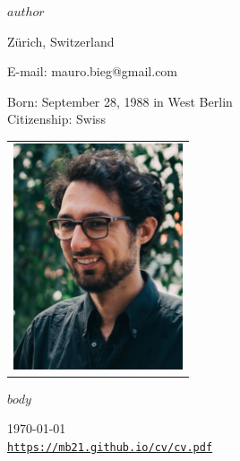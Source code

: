 \documentclass{article}
\def\name{$author$}
\def\footerlink{https://mb21.github.io/cv/cv.pdf}
\begin{document}
\begin{minipage}{10cm}
	{\huge \name}
	
	\vspace{7mm}
	
	Zürich, Switzerland\\
	
	\vspace{-3mm}
	
	E-mail: mauro.bieg@gmail.com\\
	
	\vspace{-3mm}
	
	Born: September 28, 1988 in West Berlin \\
	Citizenship: Swiss
\end{minipage}
\begin{minipage}{50mm}
  \begin{tabular}{r}
  	\includegraphics[width=50mm]{me.jpg}
  \end{tabular}
\end{minipage}



$body$

\bigskip

\begin{center}
  \begin{footnotesize}
    \today \\
    \href{\footerlink}{\texttt{\footerlink}}
  \end{footnotesize}
\end{center}
\end{document}
